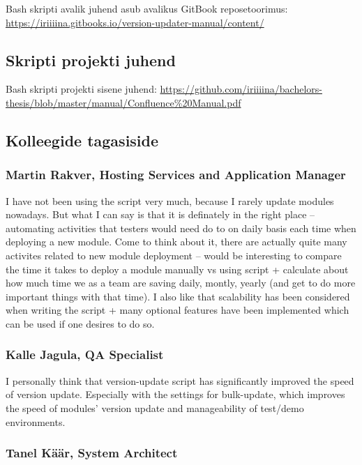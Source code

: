 \documentclass[12pt]{report}
\begin{document}
  Bash skripti avalik juhend asub avalikus GitBook reposetoorimus: \url{https://iriiiina.gitbooks.io/version-updater-manual/content/}
  
  \subsection{Skripti projekti juhend}
  
  Bash skripti projekti sisene juhend: \url{https://github.com/iriiiina/bachelors-thesis/blob/master/manual/Confluence%20Manual.pdf}
  
  \subsection{Kolleegide tagasiside}
  
  \subsubsection{Martin Rakver, Hosting Services and Application Manager}
  
  I have not been using the script very much, because I rarely update modules nowadays. But what I can say is that it is definately in the right place – automating activities that testers would need do to on daily basis each time when deploying a new module. Come to think about it, there are actually quite many activites related to new module deployment – would be interesting to compare the time it takes to deploy a module manually vs using script + calculate about how much time we as a team are saving daily, montly, yearly (and get to do more important things with that time).
I also like that scalability has been considered when writing the script + many optional features have been implemented which can be used if one desires to do so.

  \subsubsection{Kalle Jagula, QA Specialist}
  
  I personally think that version-update script has significantly improved the speed of version update. Especially with the settings for bulk-update, which improves the speed of modules' version update and manageability of test/demo environments.
  
  \subsubsection{Tanel Käär, System Architect}
  
\end{document}
